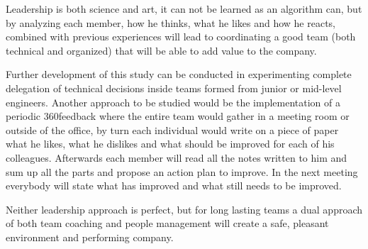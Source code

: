 Leadership is both science and art, it can not be learned as an algorithm can, but by analyzing each member, how he thinks, what he likes and how he reacts, combined with previous experiences will lead to coordinating a good team (both technical and organized) that will be able to add value to the company.

Further development of this study can be conducted in experimenting complete delegation of technical decisions inside teams formed from junior or mid-level engineers. Another approach to be studied would be the implementation of a periodic 360\textdegree feedback where the entire team would gather in a meeting room or outside of the office, by turn each individual would  write on a piece of paper what he likes, what he dislikes and what should be improved for each of his colleagues. Afterwards each member will read all the notes written to him and sum up all the parts and propose an action plan to improve. In the next meeting everybody will state what has improved and what still needs to be improved.

Neither leadership approach is perfect, but for long lasting teams a dual approach of both team coaching and people management will create a safe, pleasant environment and performing company.